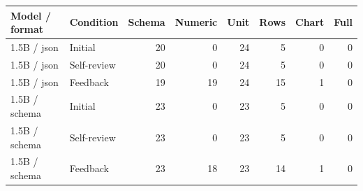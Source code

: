 \begin{tabular}{llrrrrrr}
\toprule
Model / format & Condition & Schema & Numeric & Unit & Rows & Chart & Full \\
\midrule
1.5B / json & Initial & 20 & 0 & 24 & 5 & 0 & 0 \\
1.5B / json & Self-review & 20 & 0 & 24 & 5 & 0 & 0 \\
1.5B / json & Feedback & 19 & 19 & 24 & 15 & 1 & 0 \\
1.5B / schema & Initial & 23 & 0 & 23 & 5 & 0 & 0 \\
1.5B / schema & Self-review & 23 & 0 & 23 & 5 & 0 & 0 \\
1.5B / schema & Feedback & 23 & 18 & 23 & 14 & 1 & 0 \\
\bottomrule
\end{tabular}
